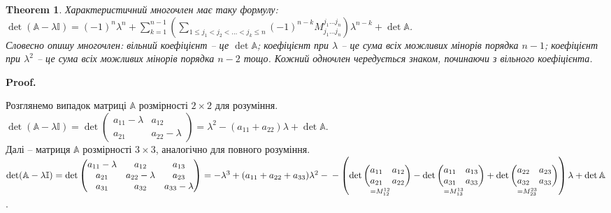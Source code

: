 \documentclass[a4paper, 10pt]{article}
\makeatletter
\theoremstyle{theoremdd}
\newtheorem{theorem}{Theorem}[subsection]
\renewenvironment{proof}[1][Proof.\\]{\par
\pushQED{\hfill \qed}%
\normalfont \topsep6\p@\@plus6\p@\relax
\trivlist
\item\relax
{\bfseries
#1\@addpunct{.}}\hspace\labelsep\ignorespaces
}{%
\popQED\endtrivlist\@endpefalse
}
\makeatother
\begin{document}
\begin{theorem}
Характеристичний многочлен має таку формулу: \\ $\det(\mathbb{A} - \lambda \mathbb{I}) = \displaystyle (-1)^n \lambda^n + \sum_{k=1}^{n-1} \left( \sum_{1 \leq j_1 < j_2 < \dots < j_k \leq n} (-1)^{n-k} M_{j_1 \dots j_n}^{j_1 \dots j_n} \right) \lambda^{n-k} + \det \mathbb{A}$.\\
\textit{Словесно опишу многочлен: вільний коефіцієнт -- це $\det \mathbb{A}$; коефіцієнт при $\lambda$ -- це сума всіх можливих мінорів порядка $n-1$; коефіцієнт при $\lambda^2$ -- це сума всіх можливих мінорів порядка $n-2$ тощо. Кожний одночлен чередується знаком, починаючи з вільного коефіцієнта.}
\end{theorem}

\begin{proof}
Розглянемо випадок матриці $\mathbb{A}$ розмірності $2 \times 2$ для розуміння.\\
$\det (\mathbb{A} - \lambda \mathbb{I}) = \det \begin{pmatrix}
a_{11}-\lambda & a_{12} \\
a_{21} & a_{22} - \lambda
\end{pmatrix} = \lambda^2 - (a_{11}+a_{22})\lambda + \det \mathbb{A}$.
\bigskip \\
Далі -- матриця $\mathbb{A}$ розмірності $3 \times 3$, аналогічно для повного розуміння.\\
$\det (\mathbb{A} - \lambda \mathbb{I}) = \det \begin{pmatrix}
a_{11}-\lambda & a_{12} & a_{13} \\
a_{21} & a_{22}-\lambda & a_{23} \\
a_{31} & a_{32} & a_{33}-\lambda \\
\end{pmatrix} = -\lambda^3 + (a_{11}+a_{22}+a_{33})\lambda^2 - \\ - \left(\underset{=M_{12}^{12}}{\det \begin{pmatrix}
a_{11} & a_{12} \\
a_{21} & a_{22}
\end{pmatrix}} - \underset{=M_{13}^{13}}{\det \begin{pmatrix}
a_{11} & a_{13} \\
a_{31} & a_{33}
\end{pmatrix}} + \underset{=M_{23}^{23}}{\det \begin{pmatrix}
a_{22} & a_{23} \\
a_{32} & a_{33}
\end{pmatrix}} \right)\lambda + \det \mathbb{A}$.\\

\end{proof}
\end{document}
